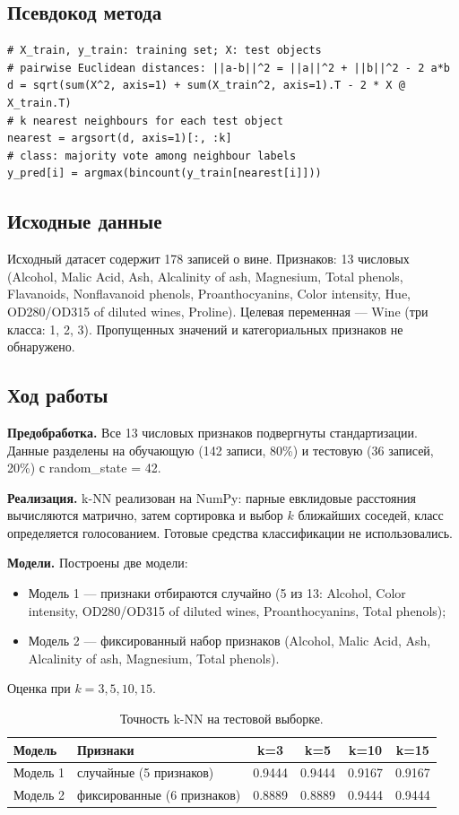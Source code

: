 \documentclass[12pt,a4paper]{article}
\begin{document}
\subsection{Псевдокод метода}
\begin{lstlisting}
# X_train, y_train: training set; X: test objects
# pairwise Euclidean distances: ||a-b||^2 = ||a||^2 + ||b||^2 - 2 a*b
d = sqrt(sum(X^2, axis=1) + sum(X_train^2, axis=1).T - 2 * X @ X_train.T)
# k nearest neighbours for each test object
nearest = argsort(d, axis=1)[:, :k]
# class: majority vote among neighbour labels
y_pred[i] = argmax(bincount(y_train[nearest[i]]))
\end{lstlisting}

\subsection{Исходные данные}
Исходный датасет содержит 178 записей о вине. Признаков: 13 числовых (Alcohol, Malic Acid, Ash, Alcalinity of ash, Magnesium, Total phenols, Flavanoids, Nonflavanoid phenols, Proanthocyanins, Color intensity, Hue, OD280/OD315 of diluted wines, Proline). Целевая переменная --- Wine (три класса: 1, 2, 3). Пропущенных значений и категориальных признаков не обнаружено.

\subsection{Ход работы}
\textbf{Предобработка.} Все 13 числовых признаков подвергнуты стандартизации. Данные разделены на обучающую (142 записи, 80\%) и тестовую (36 записей, 20\%) с random\_state = 42.

\textbf{Реализация.} k-NN реализован на NumPy: парные евклидовые расстояния вычисляются матрично, затем сортировка и выбор $k$ ближайших соседей, класс определяется голосованием. Готовые средства классификации не использовались.

\textbf{Модели.} Построены две модели:
\begin{itemize}
\item Модель 1 --- признаки отбираются случайно (5 из 13: Alcohol, Color intensity, OD280/OD315 of diluted wines, Proanthocyanins, Total phenols);
\item Модель 2 --- фиксированный набор признаков (Alcohol, Malic Acid, Ash, Alcalinity of ash, Magnesium, Total phenols).
\end{itemize}
Оценка при $k = 3, 5, 10, 15$.

\begin{table}[H]
\centering
\caption{Точность k-NN на тестовой выборке.}
\label{tab:lab4_metrics}
\small
\begin{tabular}{llcccc}
\toprule
Модель & Признаки & k=3 & k=5 & k=10 & k=15 \\
\midrule
Модель 1 & случайные (5 признаков) & 0.9444 & 0.9444 & 0.9167 & 0.9167 \\
Модель 2 & фиксированные (6 признаков) & 0.8889 & 0.8889 & 0.9444 & 0.9444 \\
\bottomrule
\end{tabular}
\end{table}
\end{document}
